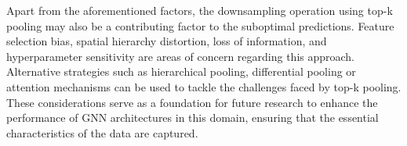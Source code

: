 Apart from the aforementioned factors, the downsampling operation using top-k pooling may also be a contributing factor to the suboptimal predictions. Feature selection bias, spatial hierarchy distortion, loss of information, and hyperparameter sensitivity are areas of concern regarding this approach. Alternative strategies such as hierarchical pooling, differential pooling or attention mechanisms can be used to tackle the challenges faced by top-k pooling. These considerations serve as a foundation for future research to enhance the performance of GNN architectures in this domain, ensuring that the essential characteristics of the data are captured.
